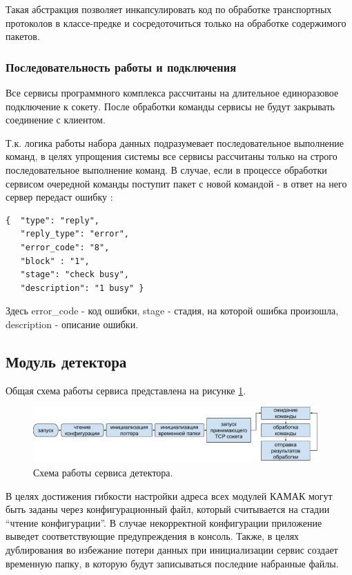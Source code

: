 \documentclass[a4paper,14pt]{extreport}
\begin{document}
Такая абстракция позволяет инкапсулировать код по обработке транспортных протоколов в классе-предке и сосредоточиться только на обработке содержимого пакетов.


\subsubsection{Последовательность работы и подключения}
Все сервисы программного комплекса рассчитаны на длительное единоразовое подключение к сокету. После обработки команды сервисы не будут закрывать соединение с клиентом. 

Т.к. логика работы набора данных подразумевает последовательное выполнение команд, в целях упрощения системы все сервисы рассчитаны только на строго последовательное выполнение команд. В случае, если в процессе обработки сервисом очередной команды поступит пакет с новой командой - в ответ на него сервер передаст ошибку :

\begin{lstlisting}[caption={Пример сообщения об ошибке (сервис занят).}, captionpos=b]
{  "type": "reply",
   "reply_type": "error",
   "error_code": "8",
   "block" : "1",
   "stage": "check busy",
   "description": "1 busy" }
\end{lstlisting}

Здесь error\_code - код ошибки, stage - стадия, на которой ошибка произошла, description - описание ошибки.

\subsection{Модуль детектора}

Общая схема работы сервиса представлена на рисунке \ref{fig:numass-detector-workflow}.

\begin{figure}
  \centering
  \includegraphics[width = 0.98\textwidth]{img/nu_mass_setup/detector_workflow.pdf}
    \caption{Схема работы сервиса детектора.}
    \label{fig:numass-detector-workflow}
\end{figure}

В целях достижения гибкости настройки адреса всех модулей КАМАК могут быть заданы через конфигурационный файл, который считывается на стадии “чтение конфигурации”. В случае некорректной конфигурации приложение выведет соответствующие предупреждения в консоль. Также, в целях дублирования во избежание потери данных при инициализации сервис создает временную папку, в которую будут записываться последние набранные файлы.
\end{document}

